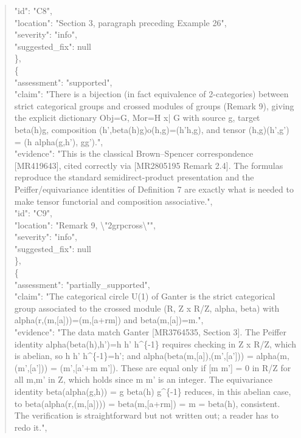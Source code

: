 \documentclass[11pt]{article}
\begin{document}
\begin{quote}
      "id": "C8",\\
      "location": "Section 3, paragraph preceding Example 26",\\
      "severity": "info",\\
      "suggested\_fix": null\\
    \},\\
    \{\\
      "assessment": "supported",\\
      "claim": "There is a bijection (in fact equivalence of 2-categories) between strict categorical groups and crossed modules of groups (Remark 9), giving the explicit dictionary Obj=G, Mor=H x| G with source g, target beta(h)g, composition (h',beta(h)g)o(h,g)=(h'h,g), and tensor (h,g)(h',g') = (h alpha(g,h'), gg').",\\
      "evidence": "This is the classical Brown--Spencer correspondence [MR419643], cited correctly via [MR2805195 Remark 2.4]. The formulas reproduce the standard semidirect-product presentation and the Peiffer/equivariance identities of Definition 7 are exactly what is needed to make tensor functorial and composition associative.",\\
      "id": "C9",\\
      "location": "Remark 9, \textbackslash{}"2grpcross\textbackslash{}"",\\
      "severity": "info",\\
      "suggested\_fix": null\\
    \},\\
    \{\\
      "assessment": "partially\_supported",\\
      "claim": "The categorical circle U(1) of Ganter is the strict categorical group associated to the crossed module (R, Z x R/Z, alpha, beta) with alpha(r,(m,[a]))=(m,[a+rm]) and beta(m,[a])=m.",\\
      "evidence": "The data match Ganter [MR3764535, Section 3]. The Peiffer identity alpha(beta(h),h')=h h' h\^{}\{-1\} requires checking in Z x R/Z, which is abelian, so h h' h\^{}\{-1\}=h'; and alpha(beta(m,[a]),(m',[a'])) = alpha(m,(m',[a'])) = (m',[a'+m m']). These are equal only if [m m'] = 0 in R/Z for all m,m' in Z, which holds since m m' is an integer. The equivariance identity beta(alpha(g,h)) = g beta(h) g\^{}\{-1\} reduces, in this abelian case, to beta(alpha(r,(m,[a]))) = beta(m,[a+rm]) = m = beta(h), consistent. The verification is straightforward but not written out; a reader has to redo it.",\\

\end{quote}
\end{document}

